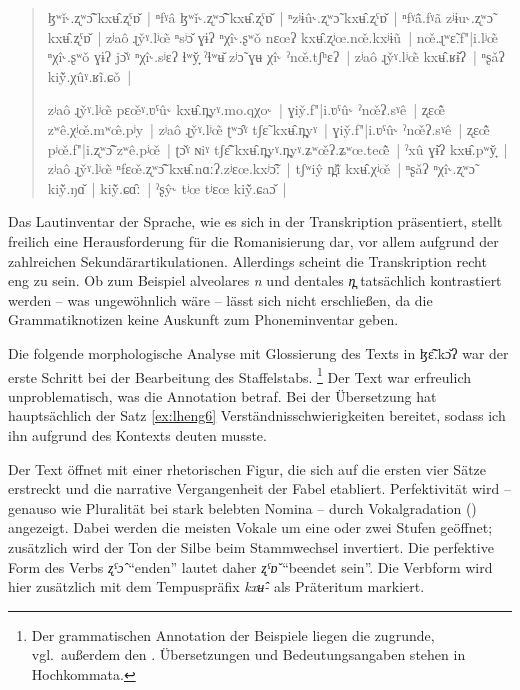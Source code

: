 \documentclass[
	12pt,
	ngerman,
]{scrartcl}
\let\q\textquote
\newcommand{\wdef}[1]{{\setquotestyle{wdef}\enquote{#1}}}
\newcommand{\fw}[1]{\textit{#1}} %
\newcommand{\tit}[1]{\textit{#1}} %
\newcommand{\Lhengko}{ɮɛ̃̂.kɔ̌ʔ}
\begin{document}
\begin{quote}
\begin{sloppypar}
	ɮʷǐ˞.ʐʷɔ̃̂ kxʉ̂.ʐˤɒ̌~|
	ⁿfˠâ ɮʷǐ˞.ʐʷɔ̃̂ kxʉ̂.ʐˤɒ̌~|
	ⁿzʲɨû˞.ʐʷɔ̃ kxʉ̂.ʐˤɒ̌~|
	ⁿfˠã̂.fˠã zʲɨu˞.ʐʷɔ̃ kxʉ̂.ʐˤɒ̌~|
	zʲaô ɻy̌ˠ.lʲœ̃ ⁿsʲɔ̌ ɣɨʔ ⁿχî˞.ʂʷǒ nɛœʔ kxʉ̂.ʐʲœ.nœ̌.kxʲɨũ~|
	nœ̌.ɻʷɛ̃.f"|i.lʲœ̃ ⁿχî˞.ʂʷǒ ɣɨʔ jɔ̌ˠ ⁿχî˞.sʲɛʔ ɬʷy̟̌ ˀɬʷʉ̌ zʲɔ̃ ɣʉ χî˞ ˀnœ̌.tʃʰɛʔ~|
	zʲaô ɻy̌ˠ.lʲœ̃ kxʉ̂.ʁɨ̌ʔ~|
	ⁿʂǎʔ kiỹ̌.χûˠ.ʁĩ.ɕǒ~|
	
	zʲaô ɻy̌ˠ.lʲœ̃ pɛœ̌ˠ.ʋˤû˞ kxʉ̂.n̪yˠ.mo.qχo˞~|
	ɣiy̌.f"|i.ʋˤû˞ ˀnœ̌ʔ.sˠê~|
	ʐɛœ̃̂ zʷê.χʲœ̌.mʷœ̂.pʲy~|
	zʲaô ɻy̌ˠ.lʲœ̃ ʈʷɔ̂ˠ tʃɛ̃ kxʉ̂.n̪yˠ~|
	ɣiy̌.f"|i.ʋˤû˞ ˀnœ̌ʔ.sˠê~|
	ʐɛœ̃̂ pʲœ̌.f"|i.ʐʷɔ̃̂ zʷê.pʲœ̌~|
	ʈɔ̌ˠ ɴiˠ tʃɛ̃̂ kxʉ̂.n̪yˠ.n̪yˠ.ʑʷœ̌ʔ.ʑʷœ.teœ̃̂~|
	ˀxû ɣɨ̌ʔ kxʉ̂.pʷy̟̌~|
	zʲaô ɻy̌ˠ.lʲœ̃ ⁿfɛœ̌.ʐʷɔ̃̂ kxʉ̂.nɑːʔ.zʲɛœ.kxʲɔ̃̂ː~|
	tʃʷiŷ n̪ʲĩ̌ kxʉ̂.χʲœ̌~|
	ⁿʂǎʔ ⁿχî˞.ʐʷɔ̃ kiỹ̌.ŋɑ̌~|
	kiỹ̌.ɕɑ̂ː~|
	ˀʂŷ˞ tʲœ tʲɛœ kiỹ̌.ɕaɔ̌~|
\end{sloppypar}
\end{quote}

Das Lautinventar der Sprache, wie es sich in der Transkription präsentiert,
stellt freilich eine Herausforderung für die Romanisierung dar, vor allem
aufgrund der zahlreichen Sekundärartikulationen. Allerdings scheint die
Transkription recht eng zu sein. Ob zum Beispiel alveolares \emph{n} und
dentales \emph{n̪} tatsächlich kontrastiert werden -- was ungewöhnlich wäre --
lässt sich nicht erschließen, da die Grammatiknotizen keine Auskunft zum
Phoneminventar geben.

Die folgende morphologische Analyse mit Glossierung des Texts in \Lhengko{} war
der erste Schritt bei der Bearbeitung des Staffelstabs.%
%
	\footnote{Der grammatischen Annotation der Beispiele liegen die
	\tit{} \autocite{lgr} zugrunde, vgl.~außerdem den
	 \tit{}. Übersetzungen und
	Bedeutungsangaben stehen in Hochkommata.}
%
Der Text war erfreulich unproblematisch, was die Annotation betraf. Bei der
Übersetzung hat hauptsächlich der Satz \cref{ex:lheng6}
Verständnis\-schwierigkeiten bereitet, sodass ich ihn aufgrund des Kontexts
deuten musste.

Der Text öffnet mit einer rhetorischen Figur, die sich auf die ersten vier
Sätze  erstreckt und die narrative
Vergangenheit der Fabel etabliert. Perfektivität wird -- genauso wie Pluralität
bei stark belebten Nomina -- durch Vokalgradation (\q{Ablaut}) angezeigt. Dabei
werden die meisten Vokale um eine oder zwei Stufen geöffnet; zusätzlich wird
der Ton der Silbe beim Stammwechsel invertiert. Die perfektive Form des Verbs
\fw{ʐˤɔ̂} \wdef{enden} lautet daher \fw{ʐˤɒ̌} \wdef{beendet sein}. Die Verbform
wird hier zusätzlich mit dem Tempuspräfix \fw{kxʉ̂-} als Präteritum markiert.
\end{document}

